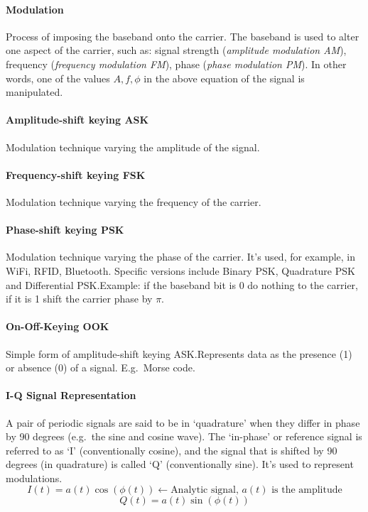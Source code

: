 \paragraph{Modulation}
Process of imposing the baseband onto the carrier.
The baseband is used to alter one aspect of the carrier, such as:
signal strength (\textit{amplitude modulation AM}), frequency (\textit{frequency modulation FM}), phase (\textit{phase modulation PM}).
In other words, one of the values $A, f, \phi$ in the above equation of the signal is manipulated.

\paragraph{Amplitude-shift keying ASK}
Modulation technique varying the amplitude of the signal.

\paragraph{Frequency-shift keying FSK}
Modulation technique varying the frequency of the carrier.

\paragraph{Phase-shift keying PSK}
Modulation technique varying the phase of the carrier. It's used, for example, in WiFi, RFID, Bluetooth. Specific versions include Binary PSK, Quadrature PSK and Differential PSK.\@ Example: if the baseband bit is 0 do nothing to the carrier, if it is 1 shift the carrier phase by $\pi$.

\paragraph{On-Off-Keying OOK}
Simple form of amplitude-shift keying ASK.\@ Represents data as the presence (1) or absence (0) of a signal. E.g.\ Morse code.

\paragraph{I-Q Signal Representation}
A pair of periodic signals are said to be in `quadrature' when they differ in phase by 90 degrees (e.g.\ the sine and cosine wave).
The `in-phase' or reference signal is referred to as `I' (conventionally cosine), and the signal that is shifted by 90 degrees (in quadrature) is called `Q' (conventionally sine). It's used to represent modulations.
\[ I(t) = a(t) \cos (\phi(t)) \leftarrow  \textrm{Analytic signal, } a(t) \textrm{ is the amplitude}\]
\[ Q(t) = a(t) \sin (\phi(t)) \]

